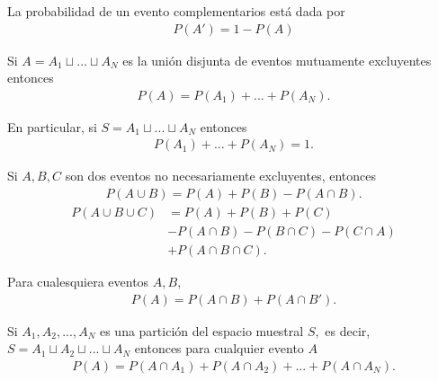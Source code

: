 \begin{teorema}
	\label{thm:1.4} La probabilidad de un evento complementarios está dada por
	\begin{align}
		\label{1.7}
		P(A')=1-P(A)
	\end{align}
\end{teorema}


\begin{teorema}
	\label{thm:1.5} Si $A=A_{1}\sqcup...\sqcup A_{N}$ es la unión disjunta de eventos mutuamente excluyentes entonces
	\begin{align}
		\label{1.8}
		P(A)=P(A_{1})+...+P(A_{N}).
	\end{align}
	
	
	En particular, si $S=A_{1}\sqcup...\sqcup A_{N}$ entonces
	\begin{align}
		\label{1.9}
		P(A_{1})+...+P(A_{N})=1.
	\end{align}
\end{teorema}


\begin{teorema}
	\label{thm:1.6}
	Si $A,B,C$ son dos eventos no necesariamente excluyentes, entonces
	\begin{align}
		\label{1.10}
		P(A\cup B)=P(A)+P(B)-P(A\cap B).
	\end{align}
	\begin{align}
		\label{1.11}
		P(A\cup B \cup C)&=P(A)+P(B)+P(C)\\
		&-P(A\cap B)-P(B\cap C)-P(C\cap A)\\
		&+P(A\cap B \cap C).
	\end{align}
\end{teorema}



\begin{teorema}
	\label{thm:1.7}
	Para cualesquiera eventos $A,B,$
	\begin{align}
		\label{1.12}
		P(A)=P(A\cap B)+P(A\cap B').
	\end{align}
\end{teorema}


\begin{teorema}
	\label{thm:1.8}
	Si $A_{1},A_{2},..., A_{N}$ es una partición del espacio muestral $S,$ es decir,
	$S=A_{1} \sqcup A_{2} \sqcup ... \sqcup A_{N}$ entonces para cualquier evento $A$
	\begin{align}
		\label{1.13}
		P(A)=P(A\cap A_{1})+ P(A\cap A_{2}) + ... +P(A\cap A_{N}).
	\end{align}
\end{teorema}


